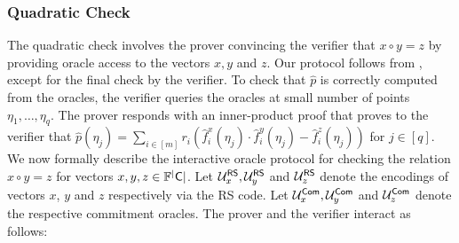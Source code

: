 \subsubsection{Quadratic Check}\label{sec:quadcheck2D}
The quadratic check involves the prover convincing the verifier that $x\circ y=z$ by providing oracle access to the vectors $x,y$ and $z$. Our protocol follows from \cite{Ligero2017}, except for the final check by the verifier. To check that $\hat{p}$ is correctly computed from the oracles, the verifier queries the oracles at small number of points $\eta_1,\ldots,\eta_q$. The prover responds with an inner-product proof that proves to the verifier that $\hat{p}(\eta_j)=\sum_{i\in [m]}r_i(\hat{f}^x_i(\eta_j) \cdot \hat{f}^y_i(\eta_j)-\hat{f}^z_i(\eta_j))$ for $j\in [q]$.\\

We now formally describe the interactive oracle protocol for checking the relation $x\circ y = z$ for vectors $x,y,z\in \mathbb{F}^|\mathsf{C}|$. Let $\mathcal{U}^{\mathsf{RS}}_x, \mathcal{U}^{\mathsf{RS}}_y$ and $\mathcal{U}^{\mathsf{RS}}_z$ denote the encodings of vectors $x$, $y$ and $z$ respectively via the RS code. Let $\mathcal{U}^{\mathsf{Com}}_x,\mathcal{U}^{\mathsf{Com}}_y$ and $\mathcal{U}^{\mathsf{Com}}_z$ denote the respective commitment oracles. The prover and the verifier interact as follows:

